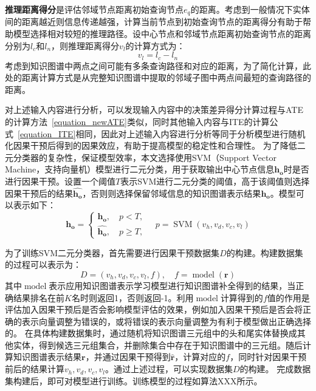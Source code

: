 \documentclass[algorithmlist, AutoFakeBold, AutoFakeSlant, figurelist, tablelist, nomlist, masters]{seuthesix}
\begin{document}
\textbf{推理距离得分}是评估邻域节点距离初始查询节点$e_q$的距离。考虑到一般情况下实体间的距离越近则信息传递越强，计算当前节点到初始查询节点的距离得分有助于帮助模型选择相对较短的推理路径。设中心节点和邻域节点距离初始查询节点的距离分别为$l_c$和$l_n$，则推理距离得分$v_l$的计算方式为：
\begin{equation}
  v_l = l_c - l_n
\end{equation}
考虑到知识图谱中两点之间可能有多条查询路径和对应的距离，为了简化计算，此处的距离计算方式是从完整知识图谱中提取的邻域子图中两点间最短的查询路径的距离。

对上述输入内容进行分析，可以发现输入内容中的决策差异得分计算过程与ATE的计算方法~\ref{equation_newATE}类似，同时其他输入内容与ITE的计算公式~\ref{equation_ITE}相同，因此对上述输入内容进行分析等同于分析模型进行随机化因果干预后得到的因果效应，有助于提高模型的稳定性和合理性。
为了降低二元分类器的复杂性，保证模型效率，本文选择使用SVM（Support Vector Machine，支持向量机）模型进行二元分类，用于获取输出中心节点信息$\bm{h_o}$时是否进行因果干预。设置一个阈值$T$表示SVM进行二元分类的阈值，高于该阈值则选择因果干预后的结果$\bm{\hat{h_o}}$，否则则选择保留邻域信息的知识图谱表示结果$\bm{h_o}$。模型可以表示如下：
\begin{equation}
  \bm{h_o} = \left\{\begin{array}{l}
  \bm{h_o},\quad p < T, \\
  \bm{\hat{h_o}},\quad p \geq T,
  \end{array} \quad p = \operatorname{SVM}\left(v_h, v_d, v_c, v_l\right)\right.
  \label{equation_SVM}
\end{equation}

为了训练SVM二元分类器，首先需要进行因果干预数据集$D$的构建。构建数据集的过程可以表示为：
\begin{equation}
  D = {(v_h, v_d, v_c, v_l, f)},\quad f = \operatorname{model}(\bm{r})
\end{equation}
其中$\operatorname{model}$表示应用知识图谱表示学习模型进行知识图谱补全得到的结果，当正确结果排名在前$K$名时则返回1，否则返回-1。利用$\operatorname{model}$计算得到的$f$值的作用是评估加入因果干预后是否会影响模型评估的效果，例如加入因果干预后是否会将正确的表示向量调整为错误的，或将错误的表示向量调整为有利于模型做出正确选择的。
在具体构建数据集时，通过随机将知识图谱三元组中的头和尾实体替换成其他实体，得到候选三元组集合，并删除集合中存在于知识图谱中的三元组。随后计算知识图谱表示结果$\bm{r}$，并通过因果干预得到$\bm{\hat{r}}$，计算对应的$f$，同时针对因果干预前后的结果计算$v_h, v_d, v_c, v_l$。通过上述过程，可以实现数据集$D$的构建。
完成数据集构建后，即可对模型进行训练。训练模型的过程如算法XXX所示。
\end{document}
